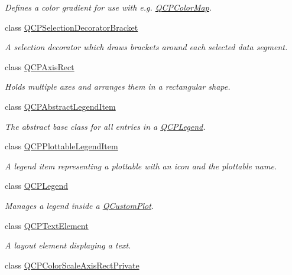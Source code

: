 \begin{DoxyCompactItemize}
\begin{DoxyCompactList}\small\item\em Defines a color gradient for use with e.\+g. \hyperlink{class_q_c_p_color_map}{Q\+C\+P\+Color\+Map}. \end{DoxyCompactList}\item 
class \hyperlink{class_q_c_p_selection_decorator_bracket}{Q\+C\+P\+Selection\+Decorator\+Bracket}
\begin{DoxyCompactList}\small\item\em A selection decorator which draws brackets around each selected data segment. \end{DoxyCompactList}\item 
class \hyperlink{class_q_c_p_axis_rect}{Q\+C\+P\+Axis\+Rect}
\begin{DoxyCompactList}\small\item\em Holds multiple axes and arranges them in a rectangular shape. \end{DoxyCompactList}\item 
class \hyperlink{class_q_c_p_abstract_legend_item}{Q\+C\+P\+Abstract\+Legend\+Item}
\begin{DoxyCompactList}\small\item\em The abstract base class for all entries in a \hyperlink{class_q_c_p_legend}{Q\+C\+P\+Legend}. \end{DoxyCompactList}\item 
class \hyperlink{class_q_c_p_plottable_legend_item}{Q\+C\+P\+Plottable\+Legend\+Item}
\begin{DoxyCompactList}\small\item\em A legend item representing a plottable with an icon and the plottable name. \end{DoxyCompactList}\item 
class \hyperlink{class_q_c_p_legend}{Q\+C\+P\+Legend}
\begin{DoxyCompactList}\small\item\em Manages a legend inside a \hyperlink{class_q_custom_plot}{Q\+Custom\+Plot}. \end{DoxyCompactList}\item 
class \hyperlink{class_q_c_p_text_element}{Q\+C\+P\+Text\+Element}
\begin{DoxyCompactList}\small\item\em A layout element displaying a text. \end{DoxyCompactList}\item 
class \hyperlink{class_q_c_p_color_scale_axis_rect_private}{Q\+C\+P\+Color\+Scale\+Axis\+Rect\+Private}

\end{DoxyCompactItemize}
